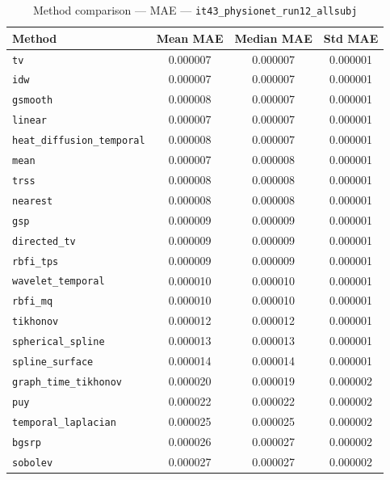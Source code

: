 \begin{table}[ht]
\centering
\caption{Method comparison — MAE — \texttt{it43_physionet_run12_allsubj}}
\label{tab:mae_it43_physionet_run12_allsubj}
\begin{tabular}{lccc}
\hline
Method & Mean MAE & Median MAE & Std MAE \\
\hline
\texttt{tv} & 0.000007 & 0.000007 & 0.000001 \\
\texttt{idw} & 0.000007 & 0.000007 & 0.000001 \\
\texttt{gsmooth} & 0.000008 & 0.000007 & 0.000001 \\
\texttt{linear} & 0.000007 & 0.000007 & 0.000001 \\
\texttt{heat_diffusion_temporal} & 0.000008 & 0.000007 & 0.000001 \\
\texttt{mean} & 0.000007 & 0.000008 & 0.000001 \\
\texttt{trss} & 0.000008 & 0.000008 & 0.000001 \\
\texttt{nearest} & 0.000008 & 0.000008 & 0.000001 \\
\texttt{gsp} & 0.000009 & 0.000009 & 0.000001 \\
\texttt{directed_tv} & 0.000009 & 0.000009 & 0.000001 \\
\texttt{rbfi_tps} & 0.000009 & 0.000009 & 0.000001 \\
\texttt{wavelet_temporal} & 0.000010 & 0.000010 & 0.000001 \\
\texttt{rbfi_mq} & 0.000010 & 0.000010 & 0.000001 \\
\texttt{tikhonov} & 0.000012 & 0.000012 & 0.000001 \\
\texttt{spherical_spline} & 0.000013 & 0.000013 & 0.000001 \\
\texttt{spline_surface} & 0.000014 & 0.000014 & 0.000001 \\
\texttt{graph_time_tikhonov} & 0.000020 & 0.000019 & 0.000002 \\
\texttt{puy} & 0.000022 & 0.000022 & 0.000002 \\
\texttt{temporal_laplacian} & 0.000025 & 0.000025 & 0.000002 \\
\texttt{bgsrp} & 0.000026 & 0.000027 & 0.000002 \\
\texttt{sobolev} & 0.000027 & 0.000027 & 0.000002 \\
\hline
\end{tabular}
\end{table}
